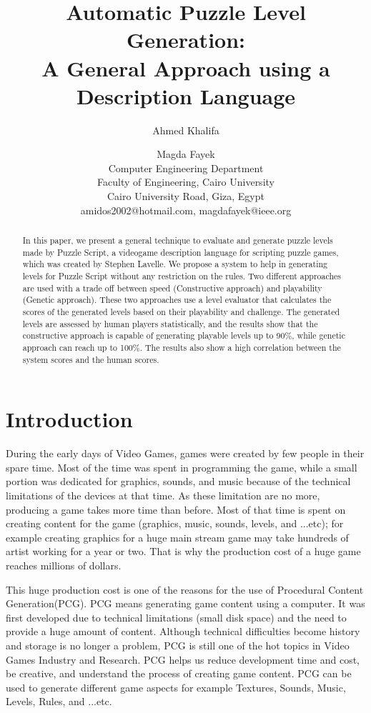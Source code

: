 \documentclass[letterpaper]{article}
\title{Automatic Puzzle Level Generation:\\
A General Approach using a Description Language}
\author{Ahmed Khalifa \and Magda Fayek\\
Computer Engineering Department\\
Faculty of Engineering, Cairo University\\
Cairo University Road, Giza, Egypt\\
amidos2002@hotmail.com, magdafayek@ieee.org\\
}
\begin{document}
 
\maketitle
\begin{abstract}
In this paper, we present a general technique to evaluate and generate puzzle levels made by Puzzle Script, a videogame description language for scripting puzzle games, which was created by Stephen Lavelle\cite{puzzleScript}. We propose a system to help in generating levels for Puzzle Script without any restriction on the rules. Two different approaches are used with a trade off between speed (Constructive approach) and playability (Genetic approach). These two approaches use a level evaluator that calculates the scores of the generated levels based on their playability and challenge. The generated levels are assessed by human players statistically, and the results show that the constructive approach is capable of generating playable levels up to 90\%, while genetic approach can reach up to 100\%. The results also show a high correlation between the system scores and the human scores.
\end{abstract}

\section{Introduction}
During the early days of Video Games, games were created by few people in their spare time. Most of the time was spent in programming the game, while a small portion was dedicated for graphics, sounds, and music because of the technical limitations of the devices at that time. As these limitation are no more, producing a game takes more time than before. Most of that time is spent on creating content for the game (graphics, music, sounds, levels, and ...etc)\cite{budgetAAA}; for example creating graphics for a huge main stream game may take hundreds of artist working for a year or two. That is why the production cost of a huge game reaches millions of dollars\cite{gameCost}.\\\par

This huge production cost is one of the reasons for the use of Procedural Content Generation(PCG). PCG means generating game content using a computer. It was first developed due to technical limitations (small disk space) and the need to provide a huge amount of content\cite{pcgFirstGame}. Although technical difficulties become history and storage is no longer a problem, PCG is still one of the hot topics in Video Games Industry and Research. PCG helps us reduce development time and cost, be creative, and understand the process of creating game content. PCG can be used to generate different game aspects for example Textures, Sounds, Music, Levels, Rules, and ...etc.\\\par
\end{document}
